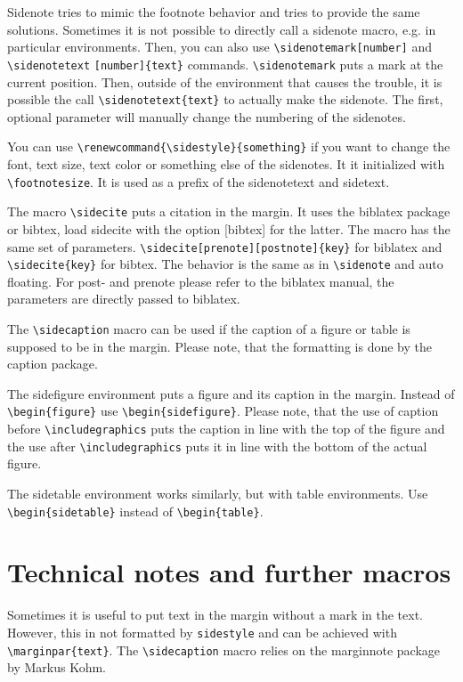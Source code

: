 \documentclass[]{caesar_book}
\begin{document}
Sidenote tries to mimic the footnote behavior and tries to provide the same solutions. 
Sometimes it is not possible to directly call a sidenote macro, e.g. in particular environments. Then, 
you can also use  \verb+\sidenotemark[number]+ and
 \verb+\sidenotetext+ \verb+[number]{text}+ 
commands. \verb+\sidenotemark+ puts a mark at the current position. Then, outside of the environment 
that causes the trouble, it is possible the call \verb+\sidenotetext{text}+ to actually make the sidenote.
The first, optional parameter will manually change the numbering of the sidenotes.

You can use \verb+\renewcommand{\sidestyle}{something}+ 
if you want to change the font, text size, text color or something else of the sidenotes.
It it initialized with \verb+\footnotesize+. It is used as a prefix of the sidenotetext and sidetext.

The macro \verb+\sidecite+ puts a citation in the margin. It uses the biblatex package or bibtex,
load sidecite with the option [bibtex] for the latter.
The macro has the same set of parameters.
\verb+\sidecite[prenote][postnote]{key}+ for biblatex and \verb+\sidecite{key}+ for bibtex.
The behavior is the same as in \verb+\sidenote+ and auto floating. 
For post- and prenote please refer to the biblatex manual, the parameters are directly passed
to biblatex.

The \verb+\sidecaption+ macro can be used if the caption of a figure or table 
is supposed to be in the margin. Please note, that the formatting is done by the 
caption package. 

The sidefigure environment puts a figure and its caption in the margin. Instead of  
\verb+\begin{figure}+ use \verb+\begin{sidefigure}+. Please note, that 
the use of caption before \verb+\includegraphics+ puts the caption in line with the
top of the figure
and the use after \verb+\includegraphics+ puts it in line with the bottom of the actual figure.

The sidetable environment works similarly, but with table environments. Use \verb+\begin{sidetable}+ instead
of \verb+\begin{table}+.

\section{Technical notes and further macros}
%
Sometimes it is useful to put text in the margin without a mark in the text. However, this in not formatted by \texttt{sidestyle} and can be achieved
with \verb+\marginpar{text}+. The \verb+\sidecaption+ macro relies on the
marginnote package by Markus Kohm. 
 
\end{document}
